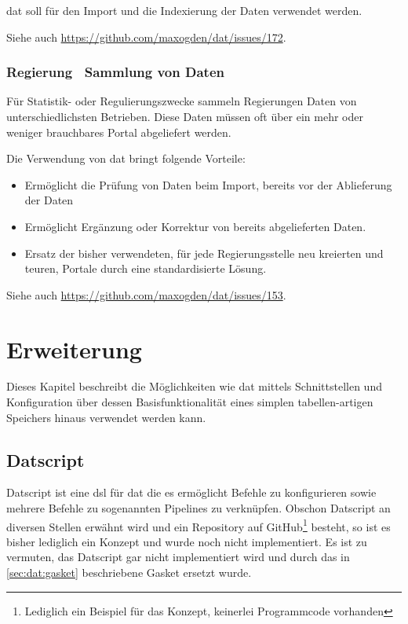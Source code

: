 dat soll für den Import und die Indexierung der Daten verwendet werden.

Siehe auch \url{https://github.com/maxogden/dat/issues/172}.

\subsection{Regierung \textendash\ Sammlung von Daten} %
Für Statistik- oder Regulierungszwecke sammeln Regierungen Daten von unterschiedlichsten Betrieben. Diese Daten müssen oft über ein mehr oder weniger brauchbares Portal abgeliefert werden.

Die Verwendung von dat bringt folgende Vorteile:
\begin{itemize}
\item Ermöglicht die Prüfung von Daten beim Import, bereits vor der Ablieferung der Daten
\item Ermöglicht Ergänzung oder Korrektur von bereits abgelieferten Daten.
\item Ersatz der bisher verwendeten, für jede Regierungsstelle neu kreierten und teuren, Portale durch eine standardisierte Lösung.
\end{itemize}

Siehe auch \url{https://github.com/maxogden/dat/issues/153}.

\chapter{Erweiterung}

Dieses Kapitel beschreibt die Möglichkeiten wie \gls{dat} mittels Schnittstellen und Konfiguration über dessen Basisfunktionalität eines simplen tabellen-artigen Speichers hinaus verwendet werden kann.

\section{Datscript} %

Datscript ist eine \gls{dsl} für \gls{dat} die es ermöglicht Befehle zu konfigurieren sowie mehrere Befehle zu sogenannten Pipelines zu verknüpfen. Obschon Datscript an diversen Stellen erwähnt wird und ein Repository auf GitHub\footnote{Lediglich ein Beispiel für das Konzept, keinerlei Programmcode vorhanden} besteht, so ist es bisher lediglich ein Konzept und wurde noch nicht implementiert. Es ist zu vermuten, das Datscript gar nicht implementiert wird und durch das in \cref{sec:dat:gasket} beschriebene Gasket ersetzt wurde.


